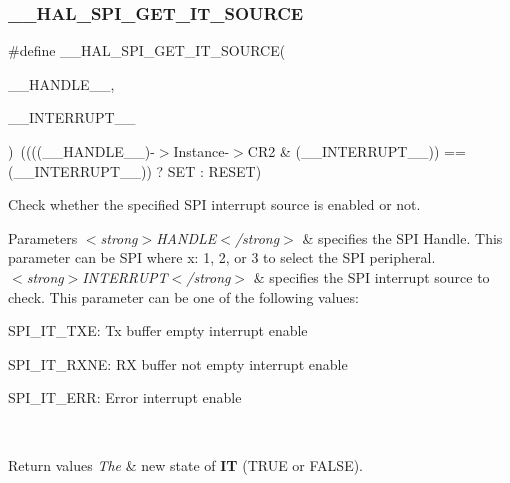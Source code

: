 \subsubsection{\texorpdfstring{\+\_\+\+\_\+\+H\+A\+L\+\_\+\+S\+P\+I\+\_\+\+G\+E\+T\+\_\+\+I\+T\+\_\+\+S\+O\+U\+R\+CE}{\_\_HAL\_SPI\_GET\_IT\_SOURCE}}
{\footnotesize\ttfamily \#define \+\_\+\+\_\+\+H\+A\+L\+\_\+\+S\+P\+I\+\_\+\+G\+E\+T\+\_\+\+I\+T\+\_\+\+S\+O\+U\+R\+CE(\begin{DoxyParamCaption}\item[{}]{\+\_\+\+\_\+\+H\+A\+N\+D\+L\+E\+\_\+\+\_\+,  }\item[{}]{\+\_\+\+\_\+\+I\+N\+T\+E\+R\+R\+U\+P\+T\+\_\+\+\_\+ }\end{DoxyParamCaption})~((((\+\_\+\+\_\+\+H\+A\+N\+D\+L\+E\+\_\+\+\_\+)-\/$>$Instance-\/$>$C\+R2 \& (\+\_\+\+\_\+\+I\+N\+T\+E\+R\+R\+U\+P\+T\+\_\+\+\_\+)) == (\+\_\+\+\_\+\+I\+N\+T\+E\+R\+R\+U\+P\+T\+\_\+\+\_\+)) ? S\+ET \+: R\+E\+S\+ET)}



Check whether the specified S\+PI interrupt source is enabled or not. 


\begin{DoxyParams}{Parameters}
{\em $<$strong$>$\+H\+A\+N\+D\+L\+E$<$/strong$>$} & specifies the S\+PI Handle. This parameter can be S\+PI where x\+: 1, 2, or 3 to select the S\+PI peripheral. \\
\hline
{\em $<$strong$>$\+I\+N\+T\+E\+R\+R\+U\+P\+T$<$/strong$>$} & specifies the S\+PI interrupt source to check. This parameter can be one of the following values\+: \begin{DoxyItemize}
\item S\+P\+I\+\_\+\+I\+T\+\_\+\+T\+XE\+: Tx buffer empty interrupt enable \item S\+P\+I\+\_\+\+I\+T\+\_\+\+R\+X\+NE\+: RX buffer not empty interrupt enable \item S\+P\+I\+\_\+\+I\+T\+\_\+\+E\+RR\+: Error interrupt enable \end{DoxyItemize}
\\
\hline
\end{DoxyParams}

\begin{DoxyRetVals}{Return values}
{\em The} & new state of {\bfseries IT} (T\+R\+UE or F\+A\+L\+SE). \\
\hline
\end{DoxyRetVals}
\mbox{\label{group___s_p_i___exported___macros_ga0d846f9517715960873e854b4a0790b0}} 
